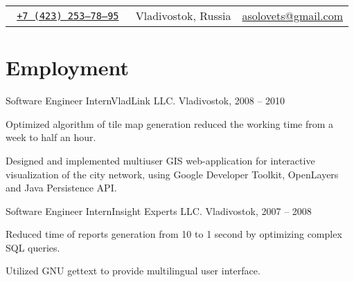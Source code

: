 \documentclass[a4paper]{article}
\def\name{\fontfamily{phv}\selectfont{Alexander Solovets}}
\begin{document}
\color{dark-gray}
\sf

\begin{center}
	{\Huge \bfseries \name}
	\vskip 4pt
	\begin{tabular}{r|c|r}
		\tt
		\href{tel:+7-423-253-78-95}{+7 (423) 253--78--95} & Vladivostok, Russia & \href{mailto:asolovets@gmail.com}{asolovets@gmail.com}\\
	\end{tabular}
\end{center}

\small

	\section{Employment}
		\begin{multicols}{2}
			\raggedcolumns
			\begin{project1}{Software Engineer Intern}{VladLink LLC. Vladivostok, 2008 -- 2010}
				\begin{items}
					\item Optimized algorithm of tile map generation reduced the working time from a week to half an hour.
					\item Designed and implemented multiuser GIS web-application for interactive visualization of the city network, using Google Developer Toolkit, OpenLayers and Java Persistence API.
				\end{items}
			\end{project1}

			\columnbreak

			\begin{project1}{Software Engineer Intern}{Insight Experts LLC. Vladivostok, 2007 -- 2008}
				\begin{items}
					\item Reduced time of reports generation from 10 to 1 second by optimizing complex SQL queries.
					\item Utilized GNU gettext to provide multilingual user interface.
				\end{items}
			\end{project1}
		\end{multicols}
\end{document}

